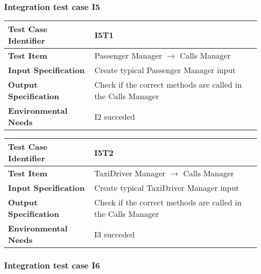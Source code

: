 \subsubsection{Integration test case I5}

\begin{table}[!htbp]
\begin{center}
\begin{tabular}[t]{p{}p{}}

\hline
\textbf{Test Case Identifier} & I5T1 \\
\hline
\textbf{Test Item} & Passenger Manager $\rightarrow$ Calls Manager \\
\hline
\textbf{Input Specification} & Create typical Passenger Manager input \\
\hline
\textbf{Output Specification} & Check if the correct methods are called in the Calls Manager \\
\hline
\textbf{Environmental Needs} & I2 succeded \\
\hline

\end{tabular}
\end{center}
\end{table}

\begin{table}[!htbp]
\begin{center}
\begin{tabular}[t]{p{}p{}}

\hline
\textbf{Test Case Identifier} & I5T2 \\
\hline
\textbf{Test Item} & TaxiDriver Manager $\rightarrow$ Calls Manager \\
\hline
\textbf{Input Specification} & Create typical TaxiDriver Manager input \\
\hline
\textbf{Output Specification} & Check if the correct methods are called in the Calls Manager \\
\hline
\textbf{Environmental Needs} & I3 succeded \\
\hline

\end{tabular}
\end{center}
\end{table}

\subsubsection{Integration test case I6}

